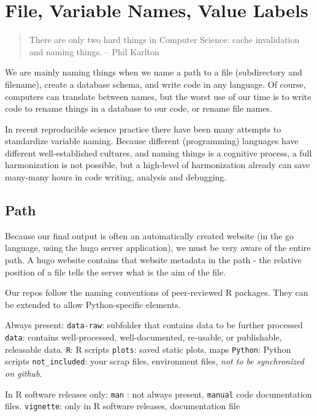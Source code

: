 \documentclass[
  fontsize=13pt,
  english,
  a4paper,
  openany, a4paper, oneside]{book}
\begin{document}
\hypertarget{naming-conventions}{%
\section{File, Variable Names, Value Labels}\label{naming-conventions}}

\begin{quote}
There are only two hard things in Computer Science: cache invalidation and naming things. -- Phil Karlton
\end{quote}

We are mainly naming things when we name a path to a file (subdirectory and filename), create a database schema, and write code in any language. Of course, computers can translate between names, but the worst use of our time is to write code to rename things in a database to our code, or rename file names.

In recent reproducible science practice there have been many attempts to standardize variable naming. Because different (programming) languages have different well-established cultures, and naming things is a cognitive process, a full harmonization is not possible, but a high-level of harmonization already can save many-many hours in code writing, analysis and debugging.

\hypertarget{path}{%
\subsection{Path}\label{path}}

Because our final output is often an automatically created website (in the go language, using the hugo server application), we must be very aware of the entire path. A hugo website contains that website metadata in the path - the relative position of a file tells the server what is the aim of the file.

Our repos follow the naming conventions of peer-reviewed R packages. They can be extended to allow Python-specific elements.

Always present:
\texttt{data-raw}: subfolder that contains data to be further processed
\texttt{data}: contains well-processed, well-documented, re-usable, or publishable, releasable data.
\texttt{R}: R scripts
\texttt{plots}: saved static plots, maps
\texttt{Python}: Python scripts
\texttt{not\_included}: your scrap files, environment files, \emph{not to be synchronized on github}.

In R software releases only:
\texttt{man} : not always present, \texttt{manual} code documentation files.
\texttt{vignette}: only in R software releases, documentation file
\end{document}
